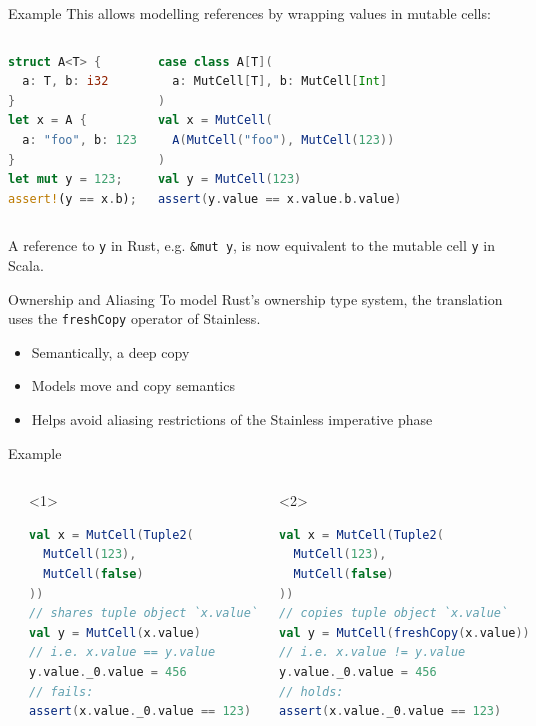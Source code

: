 \begin{frame}[fragile]{Example}
This allows modelling references by wrapping values in mutable cells:

\begin{columns}
\begin{lstlisting}[language=Rust]
struct A<T> {
  a: T, b: i32
}
let x = A {
  a: "foo", b: 123
}
let mut y = 123;
assert!(y == x.b);
\end{lstlisting}
\begin{lstlisting}[language=Scala]
case class A[T](
  a: MutCell[T], b: MutCell[Int]
)
val x = MutCell(
  A(MutCell("foo"), MutCell(123))
)
val y = MutCell(123)
assert(y.value == x.value.b.value)
\end{lstlisting}
\end{columns}

A reference to \lstinline!y! in Rust, e.g. \lstinline!&mut y!, is now equivalent
to the mutable cell \lstinline!y! in Scala.
\end{frame}



\begin{frame}{Ownership and Aliasing}
To model Rust's ownership type system, the translation uses the
\lstinline!freshCopy! operator of Stainless.

\begin{itemize}
\item Semantically, a deep copy
\item Models move and copy semantics
\item Helps avoid aliasing restrictions of the Stainless imperative phase
\end{itemize}
\end{frame}

\begin{frame}[fragile]{Example}
\begin{columns}[T]
\begin{lstlisting}[language=Rust]
let x = (
  123,
  false
);
// copies `x`
let mut y = x;

y.0 = 456;
// holds:
assert!(x.0 == 123)
\end{lstlisting}
\begin{onlyenv}<1>
\begin{lstlisting}[language=Scala]
val x = MutCell(Tuple2(
  MutCell(123),
  MutCell(false)
))
// shares tuple object `x.value`
val y = MutCell(x.value)
// i.e. x.value == y.value
y.value._0.value = 456
// fails:
assert(x.value._0.value == 123)
\end{lstlisting}
\end{onlyenv}
\begin{onlyenv}<2>
\begin{lstlisting}[language=Scala]
val x = MutCell(Tuple2(
  MutCell(123),
  MutCell(false)
))
// copies tuple object `x.value`
val y = MutCell(freshCopy(x.value))
// i.e. x.value != y.value
y.value._0.value = 456
// holds:
assert(x.value._0.value == 123)
\end{lstlisting}
\end{onlyenv}
\end{columns}
\end{frame}

